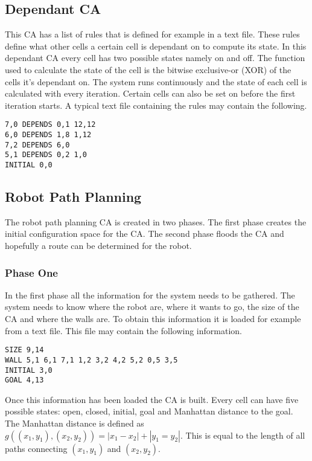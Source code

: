 \documentclass[a4paper,11pt,titlepage]{article}
\begin{document}
\subsection{Dependant CA}
This CA has a list of rules that is defined for example in a text file. These rules define what other cells a certain cell is dependant on to compute its state. In this dependant CA every cell has two possible states namely on and off. The function used to calculate the state of the cell is the bitwise exclusive-or (XOR) of the cells it's dependant on. The system runs continuously and the state of each cell is calculated with every iteration. Certain cells can also be set on before the first iteration starts. A typical text file containing the rules may contain the following.
\begin{table}[h]
\begin{verbatim}
7,0 DEPENDS 0,1 12,12
6,0 DEPENDS 1,8 1,12
7,2 DEPENDS 6,0
5,1 DEPENDS 0,2 1,0
INITIAL 0,0
\end{verbatim}
\end{table}
\subsection{Robot Path Planning}
The robot path planning CA is created in two phases. The first phase creates the initial configuration space for the CA. The second phase floods the CA and hopefully a route can be determined for the robot.

\subsubsection{Phase One}
In the first phase all the information for the system needs to be gathered. The system needs to know where the robot are, where it wants to go, the size of the CA and where the walls are. To obtain this information it is loaded for example from a text file. This file may contain the following information.\\
\begin{table}[!h]
\begin{verbatim}
SIZE 9,14
WALL 5,1 6,1 7,1 1,2 3,2 4,2 5,2 0,5 3,5
INITIAL 3,0
GOAL 4,13
\end{verbatim}
\end{table}

Once this information has been loaded the CA is built. Every cell can have five possible states: open, closed, initial, goal and Manhattan distance to the goal. The Manhattan distance is defined as $g((x_1,y_1),(x_2,y_2)) = |x_1-x_2|+|y_1=y_2|$. This is equal to the length of all paths connecting $(x_1,y_1)$ and $(x_2,y_2)$.
\end{document}
